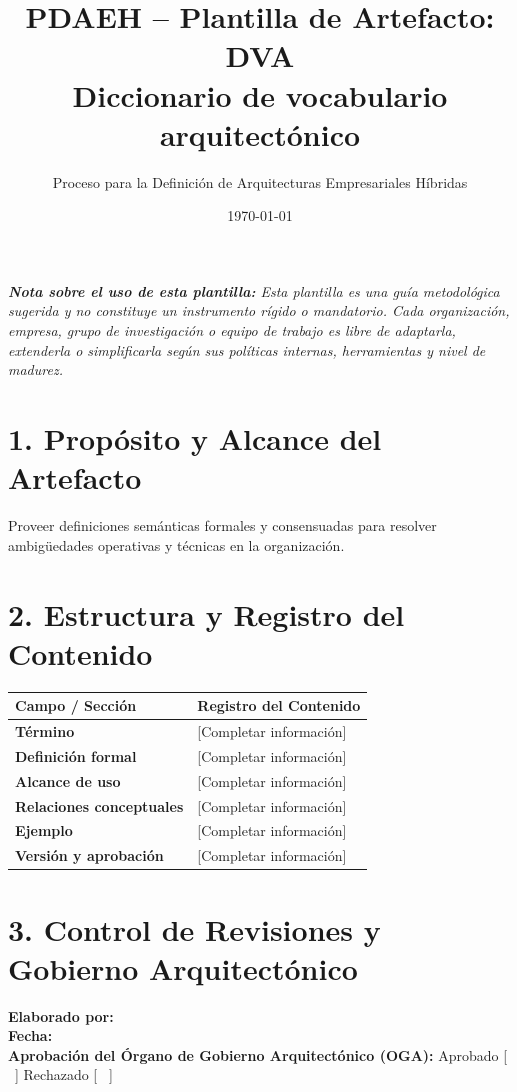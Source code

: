 \documentclass[11pt,a4paper]{article}
\title{\textbf{\color{brandgreen} PDAEH -- Plantilla de Artefacto: DVA} \\[0.3em] \large Diccionario de vocabulario arquitectónico}
\author{Proceso para la Definición de Arquitecturas Empresariales Híbridas}
\date{\today}
\begin{document}
\maketitle

\noindent \textit{\textbf{Nota sobre el uso de esta plantilla:} Esta plantilla es una guía metodológica sugerida y no constituye un instrumento rígido o mandatorio. Cada organización, empresa, grupo de investigación o equipo de trabajo es libre de adaptarla, extenderla o simplificarla según sus políticas internas, herramientas y nivel de madurez.}

\section*{1. Propósito y Alcance del Artefacto}
Proveer definiciones semánticas formales y consensuadas para resolver ambigüedades operativas y técnicas en la organización.

\section*{2. Estructura y Registro del Contenido}
\begin{tabularx}{\textwidth}{|>{\bfseries}p{4.5cm}|X|}
    \hline
    \rowcolor[gray]{0.92} Campo / Sección & Registro del Contenido \\ \hline
    \textbf{Término} & [Completar información] \\ \hline
    \textbf{Definición formal} & [Completar información] \\ \hline
    \textbf{Alcance de uso} & [Completar información] \\ \hline
    \textbf{Relaciones conceptuales} & [Completar información] \\ \hline
    \textbf{Ejemplo} & [Completar información] \\ \hline
    \textbf{Versión y aprobación} & [Completar información] \\ \hline
\end{tabularx}

\vspace{1.2cm}
\section*{3. Control de Revisiones y Gobierno Arquitectónico}
\noindent \textbf{Elaborado por:} \hrulefill \\[0.5em]
\textbf{Fecha:} \hrulefill \\[0.5em]
\textbf{Aprobación del Órgano de Gobierno Arquitectónico (OGA):} Aprobado [ \, ] \quad Rechazado [ \, ]
\end{document}
